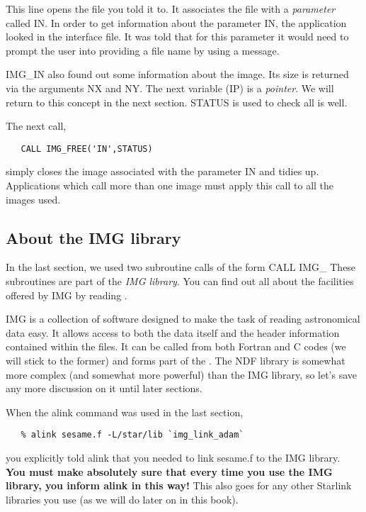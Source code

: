 This line opens the file you told it to. It associates the file with a
{\it parameter} called {\sf IN}. In order to get information about the
parameter {\sf IN}, the application looked in the interface file. It was
told that for this parameter it would need to prompt the user into
providing a file name by using a message. 

{\sf IMG\_IN} also found out some information about the image. Its size
is returned via the arguments {\sf NX} and {\sf NY}.  The next variable
({\sf IP}) is a {\it pointer}. We will return to this concept in the next
section.  {\sf STATUS} is used to check all is well. 

The next call,

\begin{verbatim}
   CALL IMG_FREE('IN',STATUS)
\end{verbatim}

simply closes the image associated with the parameter {\sf IN} and tidies
up. Applications which call more than one image must apply this call to
all the images used. 

\subsection{About the IMG library}

In the last section, we used two subroutine calls of the form {\sf CALL
IMG\_} These subroutines are part of the {\it IMG library}. You can find
out all about the facilities offered by IMG by reading
. 

IMG is a collection of software designed to make the task of reading 
astronomical data easy. It allows access to both the data itself and the
header information contained within the files. It can be called from both
Fortran and C codes (we will stick to the former) and forms part
of the . The NDF library is somewhat more
complex (and somewhat more powerful) than the IMG library, so let's save
any more discussion on it until later sections.

When the {\sf alink} command was used in the last section,

\begin{verbatim} 
   % alink sesame.f -L/star/lib `img_link_adam`
\end{verbatim}

you explicitly told alink that you needed to link {\sf sesame.f} to
the IMG library. {\bf You must make absolutely sure that every
time you use the IMG library, you inform alink in this way!} This
also goes for any other Starlink libraries you use (as we will do later 
on in this book).
 
